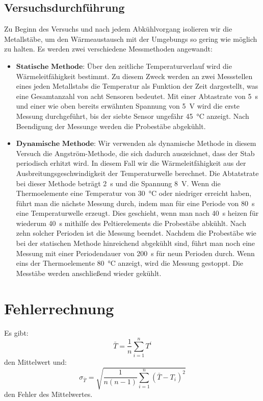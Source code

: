 \subsection{Versuchsdurchführung}
\label{sec:1}
Zu Beginn des Versuchs und nach jedem Abkühlvorgang isolieren wir die Metallstäbe,
um den Wärmeaustausch mit der Umgebungs so gering wie möglich zu halten. Es werden
zwei verschiedene Messmethoden angewandt:
\begin{itemize}
  \item $\textbf{Statische Methode:}$
    Über den zeitliche Temperaturverlauf wird die Wärmeleitfähigkeit bestimmt.
    Zu diesem Zweck werden an zwei Messstellen eines jeden Metallstabs die Temperatur
    als Funktion der Zeit dargestellt, was eine Gesamtanzahl von acht Sensoren bedeutet.
    Mit einer Abtastrate von \SI{5}{\second} und einer wie oben
    bereits erwähnten Spannung von \SI{5}{\volt} wird die erste Messung durchgeführt,
    bis der siebte Sensor ungefähr \SI{45}{\celsius} anzeigt. Nach Beendigung der Messunge
    werden die Probestäbe abgekühlt.

  \item $\textbf{Dynamische Methode:}$ Wir verwenden als dynamische Methode in diesem
    Versuch die Angström-Methode, die sich dadurch auszeichnet, dass der Stab periodisch erhitzt wird.
    In diesem Fall wir die Wärmeleitfähigkeit aus der Ausbreitungsgeschwindigkeit der
    Temperaturwelle berechnet. Die Abtatstrate bei dieser Methode beträgt \SI{2}{\second}
    und die Spannung \SI{8}{\volt}.
    Wenn die Thermoelemente eine Temperatur von \SI{30}{\celsius} oder niedriger erreicht haben,
    führt man die nächste Messung durch, indem man für eine Periode von \SI{80}{\second}
    eine Temperaturwelle erzeugt. Dies geschieht, wenn man nach \SI{40}{\second} heizen für
    wiederum \SI{40}{\second} mithilfe des Peltierelements die Probestäbe abkühlt.
    Nach zehn solcher Perioden ist die Messung beendet. Nachdem die Probestäbe wie bei der
    statischen Methode hinreichend abgekühlt sind, führt man noch eine Messung mit einer
    Periodendauer von \SI{200}{\second} für neun
    Perioden durch. Wenn eins der Thermoelemente \SI{80}{\celsius} anzeigt, wird die Messung gestoppt.
    Die Messtäbe werden anschließend wieder gekühlt.
\end{itemize}
\section{Fehlerrechnung}
Es gibt:
\begin{equation}
  \bar{T} = \frac{1}{n} \sum_{i=1}^{n} T^{i}
  \label{eqn:5}
\end{equation}
den Mittelwert und:
\begin{equation}
  \sigma_{\bar{T}} = \sqrt{\frac{1}{n(n-1)} \sum_{i=1}^{n}(\bar{T}-T_i)^2}
  \label{eqn:6}
\end{equation}
den Fehler des Mittelwertes.
